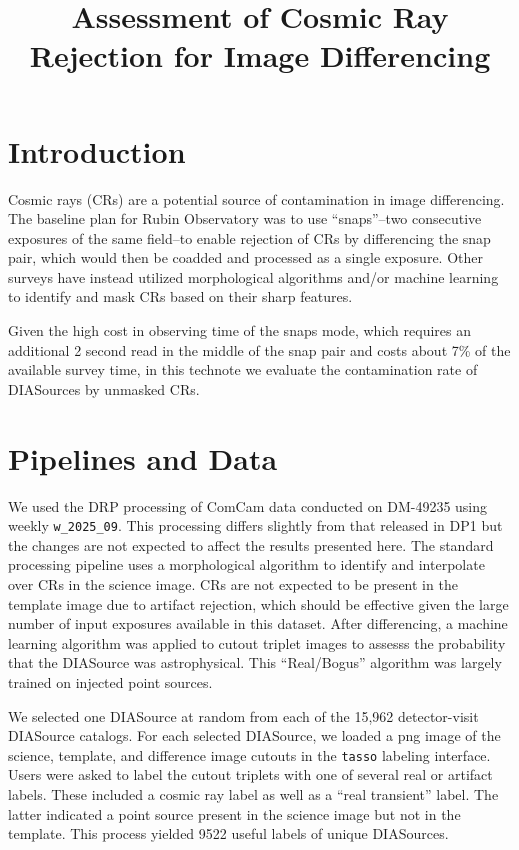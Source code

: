 \documentclass[DM,lsstdraft,authoryear,toc]{lsstdoc}
\title{Assessment of Cosmic Ray Rejection for Image Differencing}
\date{\vcsDate}
\begin{document}
\maketitle

\section{Introduction} \label{sec:intro}

Cosmic rays (CRs) are a potential source of contamination in image differencing.
The baseline plan for Rubin Observatory was to use ``snaps''--two consecutive exposures of the same field--to enable rejection of CRs by differencing the snap pair, which would then be coadded and processed as a single exposure.
Other surveys have instead utilized morphological algorithms and/or machine learning to identify and mask CRs based on their sharp features.

Given the high cost in observing time of the snaps mode, which requires an additional 2 second read in the middle of the snap pair and costs about 7\% of the available survey time, in this technote we evaluate the contamination rate of DIASources by unmasked CRs.


\section{Pipelines and Data} \label{sec:pipelines}

We used the DRP processing of ComCam data conducted on DM-49235 using weekly \texttt{w\_2025\_09}.
This processing differs slightly from that released in DP1 but the changes are not expected to affect the results presented here.
The standard processing pipeline uses a morphological algorithm to identify and interpolate over CRs in the science image.
CRs are not expected to be present in the template image due to artifact rejection, which should be effective given the large number of input exposures available in this dataset.
After differencing, a machine learning algorithm was applied to cutout triplet images to assesss the probability that the DIASource was astrophysical.
This ``Real/Bogus'' algorithm was largely trained on injected point sources.

We selected one DIASource at random from each of the 15,962 detector-visit DIASource catalogs.
For each selected DIASource, we loaded a png image of the science, template, and difference image cutouts in the \texttt{tasso} labeling interface.
Users were asked to label the cutout triplets with one of several real or artifact labels.
These included a cosmic ray label as well as a ``real transient'' label.
The latter indicated a point source present in the science image but not in the template.
This process yielded 9522 useful labels of unique DIASources.
\end{document}
